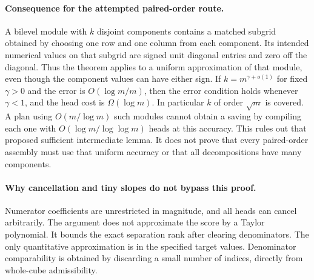 \documentclass[11pt]{article}
\begin{document}
\paragraph{Consequence for the attempted paired-order route.}
A bilevel module with $k$ disjoint components contains a matched
subgrid obtained by choosing one row and one column from each
component. Its intended numerical values on that subgrid are signed
unit diagonal entries and zero off the diagonal. Thus the theorem
applies to a uniform approximation of that module, even though the
component values can have either sign. If $k=m^{\gamma+o(1)}$ for
fixed $\gamma>0$ and the error is $O(\log m/m)$, then the error
condition holds whenever $\gamma<1$, and the head cost is
$\Omega(\log m)$. In particular $k$ of order $\sqrt m$ is covered.
A plan using $O(m/\log m)$ such modules cannot obtain a saving by
compiling each one with $O(\log m/\log\log m)$ heads at this
accuracy. This rules out that proposed sufficient intermediate
lemma. It does not prove that every paired-order assembly must use
that uniform accuracy or that all decompositions have many components.

\paragraph{Why cancellation and tiny slopes do not bypass this proof.}
Numerator coefficients are unrestricted in magnitude, and all heads
can cancel arbitrarily. The argument does not approximate the score
by a Taylor polynomial. It bounds the exact separation rank after
clearing denominators. The only quantitative approximation is in the
specified target values. Denominator comparability is obtained by
discarding a small number of indices, directly from whole-cube
admissibility.
\end{document}

